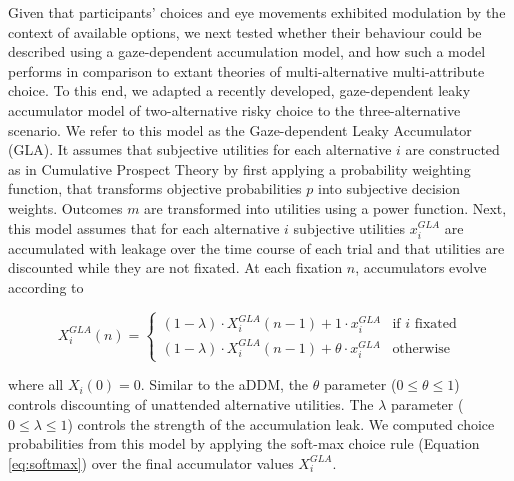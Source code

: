 \documentclass[11pt, a4paper]{article}
\begin{document}
Given that participants’ choices and eye movements exhibited modulation by the context of available options, we next tested whether their behaviour could be described using a gaze-dependent accumulation model, and how such a model performs in comparison to extant theories of multi-alternative multi-attribute choice. To this end, we adapted a recently developed, gaze-dependent leaky accumulator model of two-alternative risky choice \parencite{glickman2019FormationPreferenceRisky} to the three-alternative scenario. We refer to this model as the Gaze-dependent Leaky Accumulator (GLA). It assumes that subjective utilities for each alternative $i$ are constructed as in Cumulative Prospect Theory \parencite{tversky1992AdvancesProspectTheory} by first applying a probability weighting function, that transforms objective probabilities $p$ into subjective decision weights. Outcomes $m$ are transformed into utilities using a power function. Next, this model assumes that for each alternative $i$ subjective utilities $x_i^{GLA}$ are accumulated with leakage over the time course of each trial and that utilities are discounted while they are not fixated. At each fixation $n$, accumulators evolve according to

\begin{equation}
    \label{eq:gla:accumulator}
    X_i^{GLA}(n) = \begin{cases}
             (1 - \lambda) \cdot X_i^{GLA}(n - 1) + 1 \cdot x_i^{GLA} &\text{if $i$ fixated}\\
             (1 - \lambda) \cdot X_i^{GLA}(n - 1) + \theta \cdot x_i^{GLA} &\text{otherwise}
             \end{cases}
\end{equation}

where all $X_i(0)=0$. Similar to the aDDM, the $\theta$ parameter ($0 \le \theta \le 1$) controls discounting of unattended alternative utilities. The $\lambda$ parameter ($0 \le \lambda \le 1$) controls the strength of the accumulation leak. We computed choice probabilities from this model by applying the soft-max choice rule (Equation \ref{eq:softmax}) over the final accumulator values $X_i^{GLA}$.
\end{document}
